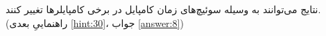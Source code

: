 \section{}
\paragraph{}\label{hint:141}
نتایج می‌توانند به وسیله سوئیچ‌های زمان کامپایل در برخی کامپایلرها تغییر کنند. (راهنماییِ بعدی \ref{hint:30}، جواب \ref{answer:8})